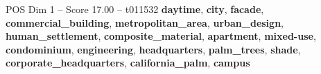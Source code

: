 \begin{textsample}{POS Dim 1 – Score 17.00 – t011532}  \label{ex:f1_pos_035}
\textbf{daytime}, \textbf{city}, \textbf{facade}, \textbf{commercial\_building}, \textbf{metropolitan\_area}, \textbf{urban\_design}, \textbf{human\_settlement}, \textbf{composite\_material}, \textbf{apartment}, \textbf{mixed-use}, \textbf{condominium}, \textbf{engineering}, \textbf{headquarters}, \textbf{palm\_trees}, \textbf{shade}, \textbf{corporate\_headquarters}, \textbf{california\_palm}, \textbf{campus}

\end{textsample}
